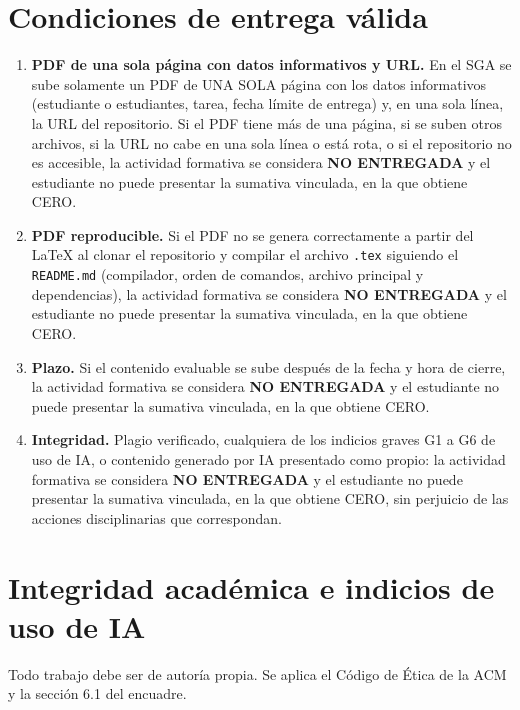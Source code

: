 \documentclass[11pt]{article}
\newcommand{\seccion}[1]{\section{\textcolor{utegreendk}{#1}}}
\begin{document}
\seccion{Condiciones de entrega válida}

\begin{cajapiso}[title={Condiciones de entrega válida: su incumplimiento equivale a no entregar}]
	\begin{enumerate}[label=\textbf{P\arabic*.},leftmargin=24pt,itemsep=3pt]
		\item \textbf{PDF de una sola página con datos informativos y URL.} En el SGA se sube solamente un PDF de UNA SOLA página con los datos informativos (estudiante o estudiantes, tarea, fecha límite de entrega) y, en una sola línea, la URL del repositorio. Si el PDF tiene más de una página, si se suben otros archivos, si la URL no cabe en una sola línea o está rota, o si el repositorio no es accesible, la actividad formativa se considera \textbf{NO ENTREGADA} y el estudiante no puede presentar la sumativa vinculada, en la que obtiene CERO.
		\item \textbf{PDF reproducible.} Si el PDF no se genera correctamente a partir del \LaTeX{} al clonar el repositorio y compilar el archivo \texttt{.tex} siguiendo el \texttt{README.md} (compilador, orden de comandos, archivo principal y dependencias), la actividad formativa se considera \textbf{NO ENTREGADA} y el estudiante no puede presentar la sumativa vinculada, en la que obtiene CERO.
		\item \textbf{Plazo.} Si el contenido evaluable se sube después de la fecha y hora de cierre, la actividad formativa se considera \textbf{NO ENTREGADA} y el estudiante no puede presentar la sumativa vinculada, en la que obtiene CERO.
		\item \textbf{Integridad.} Plagio verificado, cualquiera de los indicios graves G1 a G6 de uso de IA, o contenido generado por IA presentado como propio: la actividad formativa se considera \textbf{NO ENTREGADA} y el estudiante no puede presentar la sumativa vinculada, en la que obtiene CERO, sin perjuicio de las acciones disciplinarias que correspondan.
	\end{enumerate}
\end{cajapiso}

\seccion{Integridad académica e indicios de uso de IA}

Todo trabajo debe ser de autoría propia. Se aplica el Código de Ética de la ACM \citep{acm_code_2018} y la sección 6.1 del encuadre.
\end{document}

